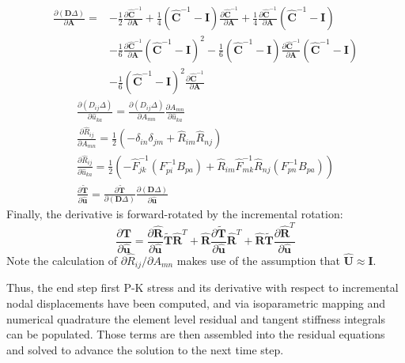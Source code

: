 \begin{equation}
\begin{aligned}
\frac{\partial ({\bm D}\Delta)}{\partial {\bm A}} = &-\frac{1}{2}\frac{\partial {\hat{\bm C}^{-1}}}{\partial \bm A} + \frac{1}{4}({\hat{\bm C}}^{-1} - {\bm I})\frac{\partial \hat{\bm C}^{-1}}{\partial {\bm A}} + \frac{1}{4}\frac{\partial \hat{\bm C}^{-1}}{\partial {\bm A}}({\hat{\bm C}}^{-1} - {\bm I}) \\
&-\frac{1}{6} \frac{\partial {\hat{\bm C}^{-1}}}{\partial \bm A} (\hat{\bm C}^{-1} - {\bm I})^{2} - \frac{1}{6}  (\hat{\bm C}^{-1} - {\bm I}) \frac{\partial {\hat{\bm C}^{-1}}}{\partial \bm A} (\hat{\bm C}^{-1} - {\bm I}) \\
&- \frac{1}{6}(\hat{\bm C}^{-1} - {\bm I})^{2} \frac{\partial {\hat{\bm C}^{-1}}}{\partial \bm A} 
\end{aligned}
\end{equation}
\begin{gather}
\frac{\partial (D_{ij}\Delta)}{\partial \hat{u}_{ka}} = \frac{\partial (D_{ij}\Delta)}{\partial A_{mn}}\frac{\partial A_{mn}}{\partial \hat{u}_{ka}} \\
\frac{\partial \hat{R}_{ij}}{\partial A_{mn}} = \frac{1}{2}(-\delta_{in}\delta_{jm} + \hat{R}_{im}\hat{R}_{nj}) \\
\frac{\partial \hat{R}_{ij}}{\partial \hat{u}_{ka}} = \frac{1}{2}\left(-\hat{F}_{jk}^{-1}(F_{pi}^{-1}B_{pa}) + \hat{R}_{im}\hat{F}_{mk}^{-1}\hat{R}_{nj}(F_{pn}^{-1}B_{pa})\right) \\
\frac{\partial \tilde{\bm T}}{\partial \hat{\bm u}} = \frac{\partial \tilde{\bm T}}{\partial ({\bm D}\Delta)}\frac{\partial ({\bm D}\Delta)}{\partial \hat{\bm u}}
\end{gather}
Finally, the derivative is forward-rotated by the incremental rotation:
\begin{equation}
\frac{\partial {\bm T}}{\partial \hat{\bm u}} = \frac{\partial \hat{\bm R}}{\partial \hat{\bm u}}{\tilde {\bm T}}{\hat{\bm R}}^{T} + {\hat{\bm R}}\frac{\partial \tilde{\bm T}}{\partial \hat{\bm u}}\hat{\bm R}^T + \hat{\bm R}\tilde{\bm T}\frac{\partial \hat{\bm R}^{T}}{\partial \hat{\bm u}}
\end{equation}
Note the calculation of ${\partial \hat{R}_{ij}}/{\partial A_{mn}}$ makes use of the assumption that $\hat{\bm{U}} \approx \bm{I}$.

Thus, the end step first P-K stress and its derivative with respect to incremental nodal displacements have been computed, and via isoparametric mapping and numerical quadrature the element level residual and tangent stiffness integrals can be populated. Those terms are then assembled into the residual equations and solved to advance the solution to the next time step.

